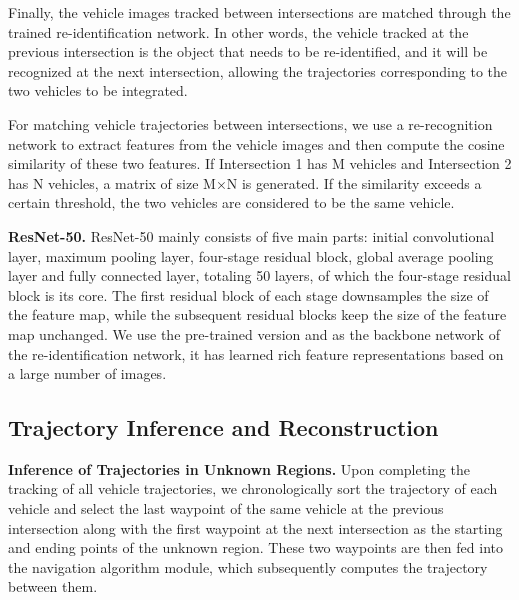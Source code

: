 \documentclass[journal,twoside,web]{ieeecolor}
\begin{document}
Finally, the vehicle images tracked between intersections are matched through the trained re-identification network.
In other words, the vehicle tracked at the previous intersection is the object that needs to be re-identified, and it will be recognized at the next intersection, allowing the trajectories corresponding to the two vehicles to be integrated.

For matching vehicle trajectories between intersections, we use a re-recognition network to extract features from the vehicle images and then compute the cosine similarity of these two features.
If Intersection 1 has M vehicles and Intersection 2 has N vehicles, a matrix of size M×N is generated. 
If the similarity exceeds a certain threshold, the two vehicles are considered to be the same vehicle.

\textbf{ResNet-50.}
ResNet-50 mainly consists of five main parts: initial convolutional layer, maximum pooling layer, four-stage residual block, global average pooling layer and fully connected layer, totaling 50 layers, of which the four-stage residual block is its core. The first residual block of each stage downsamples the size of the feature map, while the subsequent residual blocks keep the size of the feature map unchanged. We use the pre-trained version and as the backbone network of the re-identification network, it has learned rich feature representations based on a large number of images.

\subsection{Trajectory Inference and Reconstruction}

\textbf{Inference of Trajectories in Unknown Regions.}
Upon completing the tracking of all vehicle trajectories, we chronologically sort the trajectory of each vehicle and select the last waypoint of the same vehicle at the previous intersection along with the first waypoint at the next intersection as the starting and ending points of the unknown region. 
These two waypoints are then fed into the navigation algorithm module, which subsequently computes the trajectory between them.
\end{document}
